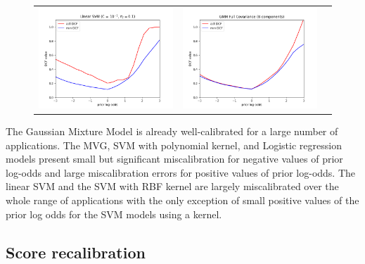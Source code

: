 \documentclass[12pt,a4paper]{article}
\begin{document}
\begin{figure}[H]
    \begin{center}
        \hspace*{-25pt}
        \begin{tabular}{ccc}
            \includegraphics[width = 200pt]{img/bayes/bayes-error-plot-svm.png} &
            \includegraphics[width = 200pt]{img/bayes/bayes-error-plot-gmm.png}   \\
        \end{tabular}
    \end{center}
\end{figure}

The Gaussian Mixture Model is already well-calibrated for a large number of applications.
The MVG, SVM with polynomial kernel, and Logistic regression models present small but significant miscalibration for negative values of prior log-odds and large miscalibration errors for positive values of prior log-odds.
The linear SVM and the SVM with RBF kernel are largely miscalibrated over the whole range of applications with the only exception of small positive values of the prior log odds for the SVM models using a kernel.

\subsection{Score recalibration}
\end{document}

